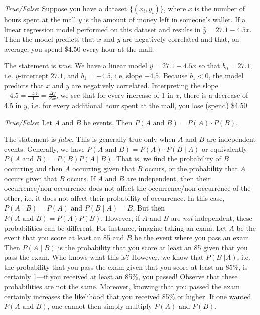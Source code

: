 \documentclass[11pt,letterpaper]{article}
\begin{document}
\quizsol \textit{True/False}: Suppose you have a dataset $\{ (x_i, y_i ) \}$, where $x$ is the number of hours spent at the mall $y$ is the amount of money left in someone's wallet. If a linear regression model performed on this dataset and results in $\widehat{y}= 27.1 - 4.5x$. Then the model predicts that $x$ and $y$ are negatively correlated and that, on average, you spend \$4.50 every hour at the mall. \pspace

\sol The statement is \textit{true}. We have a linear model $\widehat{y}= 27.1 - 4.5x$ so that $b_0= 27.1$, i.e. $y$-intercept $27.1$, and $b_1= -4.5$, i.e. slope $-4.5$. Because $b_1 < 0$, the model predicts that $x$ and $y$ are negatively correlated. Interpreting the slope $-4.5= \frac{-4.5}{1}= \frac{\Delta y}{\Delta x}$, we see that for every increase of 1 in $x$, there is a decrease of 4.5 in $y$, i.e. for every additional hour spent at the mall, you lose (spend) \$4.50. \pvspace{1.5cm}



\quizsol \textit{True/False}: Let $A$ and $B$ be events. Then $P(A \text{ and } B)= P(A) \cdot P(B)$. \pspace

\sol The statement is \textit{false}. This is generally true only when $A$ and $B$ are independent events. Generally, we have $P(A \text{ and } B)= P(A) \cdot P(B \;|\; A)$ or equivalently $P(A \text{ and } B)= P(B) P(A \;|\; B)$. That is, we find the probability of $B$ occurring and then $A$ occurring given that $B$ occurs, or the probability that $A$ occurs given that $B$ occurs. If $A$ and $B$ are independent, then their occurrence/non-occurrence does not affect the occurrence/non-occurrence of the other, i.e. it does not affect their probability of occurrence. In this case, $P(A \;|\; B)= P(A)$ and $P(B \;|\; A)= B$. But then $P(A \text{ and } B)= P(A) P(B)$. However, if $A$ and $B$ are \textit{not} independent, these probabilities can be different. For instance, imagine taking an exam. Let $A$ be the event that you score at least an 85 and $B$ be the event where you pass an exam. Then $P(A \;|\; B)$ is the probability that you score at least an 85 given that you pass the exam. Who knows what this is? However, we know that $P(B \;| A)$, i.e. the probability that you pass the exam given that you score at least an 85\%, is certainly 1---if you received at least an 85\%, you passed! Observe that these probabilities are not the same. Moreover, knowing that you passed the exam certainly increases the likelihood that you received 85\% or higher. If one wanted $P(A \text{ and } B)$, one cannot then simply multiply $P(A)$ and $P(B)$. \pvspace{1.5cm}
\end{document}
